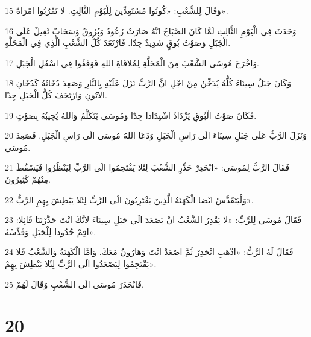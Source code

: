 \par 15 وَقَالَ لِلشَّعْبِ: «كُونُوا مُسْتَعِدِّينَ لِلْيَوْمِ الثَّالِثِ. لا تَقْرُبُوا امْرَاةً».
\par 16 وَحَدَثَ فِي الْيَوْمِ الثَّالِثِ لَمَّا كَانَ الصَّبَاحُ انَّهُ صَارَتْ رُعُودٌ وَبُرُوقٌ وَسَحَابٌ ثَقِيلٌ عَلَى الْجَبَلِ وَصَوْتُ بُوقٍ شَدِيدٌ جِدّا. فَارْتَعَدَ كُلُّ الشَّعْبِ الَّذِي فِي الْمَحَلَّةِ.
\par 17 وَاخْرَجَ مُوسَى الشَّعْبَ مِنَ الْمَحَلَّةِ لِمُلاقَاةِ اللهِ فَوَقَفُوا فِي اسْفَلِ الْجَبَلِ.
\par 18 وَكَانَ جَبَلُ سِينَاءَ كُلُّهُ يُدَخِّنُ مِنْ اجْلِ انَّ الرَّبَّ نَزَلَ عَلَيْهِ بِالنَّارِ وَصَعِدَ دُخَانُهُ كَدُخَانِ الاتُونِ وَارْتَجَفَ كُلُّ الْجَبَلِ جِدّا.
\par 19 فَكَانَ صَوْتُ الْبُوقِ يَزْدَادُ اشْتِدَادا جِدّا وَمُوسَى يَتَكَلَّمُ وَاللهُ يُجِيبُهُ بِصَوْتٍ.
\par 20 وَنَزَلَ الرَّبُّ عَلَى جَبَلِ سِينَاءَ الَى رَاسِ الْجَبَلِ وَدَعَا اللهُ مُوسَى الَى رَاسِ الْجَبَلِ. فَصَعِدَ مُوسَى.
\par 21 فَقَالَ الرَّبُّ لِمُوسَى: «انْحَدِرْ حَذِّرِ الشَّعْبَ لِئَلا يَقْتَحِمُوا الَى الرَّبِّ لِيَنْظُرُوا فَيَسْقُطَ مِنْهُمْ كَثِيرُونَ.
\par 22 وَلْيَتَقَدَّسْ ايْضا الْكَهَنَةُ الَّذِينَ يَقْتَرِبُونَ الَى الرَّبِّ لِئَلا يَبْطِشَ بِهِمِ الرَّبُّ».
\par 23 فَقَالَ مُوسَى لِلرَّبِّ: «لا يَقْدِرُ الشَّعْبُ انْ يَصْعَدَ الَى جَبَلِ سِينَاءَ لانَّكَ انْتَ حَذَّرْتَنَا قَائِلا: اقِمْ حُدُودا لِلْجَبَلِ وَقَدِّسْهُ».
\par 24 فَقَالَ لَهُ الرَّبُّ: «اذْهَبِ انْحَدِرْ ثُمَّ اصْعَدْ انْتَ وَهَارُونُ مَعَكَ. وَامَّا الْكَهَنَةُ وَالشَّعْبُ فَلا يَقْتَحِمُوا لِيَصْعَدُوا الَى الرَّبِّ لِئَلا يَبْطِشَ بِهِمْ».
\par 25 فَانْحَدَرَ مُوسَى الَى الشَّعْبِ وَقَالَ لَهُمْ.

\chapter{20}

